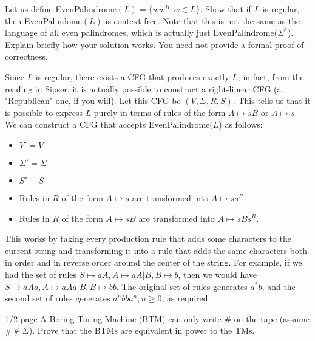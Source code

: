 \documentclass[solution, letterpaper]{cs121}
\begin{document}
 Let us define EvenPalindrome$(L)=\{ww^{R} : w \in
L\}$. Show that if $L$ is regular, then EvenPalindome$(L)$ is
context-free.  Note that this is not the same as the language of all even palindromes, which is actually just EvenPalindrome($\Sigma^*$). Explain briefly how your solution works. You need not provide a formal proof of correctness.

\begin{solution}
Since $L$ is regular, there exists a CFG that produces exactly $L$; in fact, from the reading in Sipser, it is actually possible to construct a right-linear CFG (a "Republican" one, if you will).  Let this CFG be $(V, \Sigma, R, S)$.  This tells us that it is possible to express $L$ purely in terms of rules of the form $A \mapsto sB$ or $A \mapsto s$.  We can construct a CFG that accepts EvenPalindrome($L$) as follows:
\begin{itemize}
	\setlength\itemsep{0cm}
	\item $V' = V$
	\item $\Sigma' = \Sigma$
	\item $S' = S$
	\item Rules in $R$ of the form $A \mapsto s$ are transformed into $A \mapsto ss^R$
	\item Rules in $R$ of the form $A \mapsto sB$ are transformed into $A \mapsto sBs^R$.
\end{itemize}

This works by taking every production rule that adds some characters to the current string and transforming it into a rule that adds the same characters both in order and in reverse order around the center of the string.  For example, if we had the set of rules $S \mapsto aA, A \mapsto aA | B, B \mapsto b$, then we would have $S \mapsto aAa, A \mapsto aAa | B, B \mapsto bb$.  The original set of rules generates $a^*b$, and the second set of rules generates $a^nbba^n, n \geq 0$, as required.
\end{solution}

 {1/2 page}
A Boring Turing Machine (BTM) can only write $\#$ on the tape (assume $\# \notin \Sigma$). 
Prove that the BTMs are equivalent in power to the TMs.

\begin{solution}
\end{solution}
\end{document}

